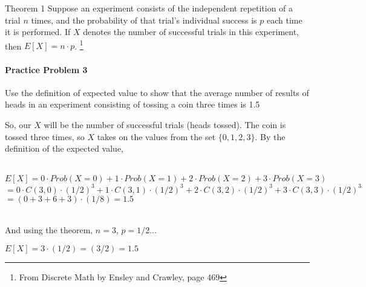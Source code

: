 \documentclass[a4paper,12pt]{book}
\begin{document}
        \begin{intro}{Theorem 1}
	        Suppose an experiment consists of the independent repetition
	        of a trial $n$ times, and the probability of that trial's
	        individual success is $p$ each time it is performed.
	        If $X$ denotes the number of successful trials in this experiment,
	        then $E[X] = n \cdot p$.
            \footnote{From Discrete Math by Ensley and Crawley, page 469}
            
            \paragraph{Practice Problem 3}
            Use the definition of expected value to show that the average
            number of results of heads in an experiment
            consisting of tossing a coin three times is 1.5
            
            So, our $X$ will be the number of successful trials (heads tossed).
            The coin is tossed three times, so $X$ takes on the values from 
            the set $\{0, 1, 2, 3\}$. By the definition of the expected value,
            
            ~\\
            $E[X] = 0 \cdot Prob(X = 0) + 1 \cdot Prob(X = 1) + 2 \cdot Prob(X = 2)
            + 3 \cdot Prob(X = 3)$ \\
            $= 0 \cdot C(3,0) \cdot (1/2)^{3} + 1 \cdot C(3,1) \cdot (1/2)^{3}
            + 2 \cdot C(3,2) \cdot (1/2)^{3} + 3 \cdot C(3,3) \cdot (1/2)^{3}$ \\
            $ = (0 + 3 + 6 + 3) \cdot (1/8) = 1.5$
            
            ~\\
            And using the theorem, $n = 3$, $p = 1/2$...
            
            $E[X] = 3 \cdot (1/2) = (3/2) = 1.5$
		\end{intro}
\end{document}
